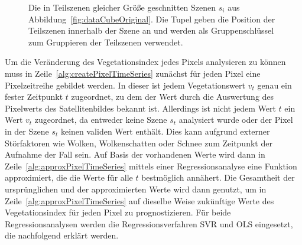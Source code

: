 \begin{figure}[H]
\centering

\caption{Die in Teilszenen gleicher Größe geschnitten Szenen \(s_i\) aus Abbildung~\ref{fig:dataCubeOriginal}. Die Tupel geben die Position der Teilszenen innerhalb der Szene an und werden als Gruppenschlüssel zum Gruppieren der Teilszenen verwendet.} 
\label{fig:dataCubeSliced}
\end{figure}

Um die Veränderung des Vegetationsindex jedes Pixels analysieren zu können muss in Zeile~\ref{alg:createPixelTimeSeries} zunächst für jeden Pixel eine Pixelzeitreihe gebildet werden. In dieser ist jedem Vegetationswert \(v_t\) genau ein fester Zeitpunkt \(t\) zugeordnet, zu dem der Wert durch die Auswertung des Pixelwerts des Satellitenbildes bekannt ist. Allerdings ist nicht jedem Wert \(t\) ein Wert \(v_t\) zugeordnet, da entweder keine Szene \(s_t\) analysiert wurde oder der Pixel in der Szene \(s_t\) keinen validen Wert enthält. Dies kann aufgrund externer Störfaktoren wie Wolken, Wolkenschatten oder Schnee zum Zeitpunkt der Aufnahme der Fall sein. Auf Basis der vorhandenen Werte wird dann in Zeile~\ref{alg:approxPixelTimeSeries} mittels einer Regressionsanalyse eine Funktion approximiert, die die Werte für alle \(t\) bestmöglich annähert.
Die Gesamtheit der ursprünglichen und der approximierten Werte wird dann genutzt, um in Zeile~\ref{alg:approxPixelTimeSeries} auf dieselbe Weise zukünftige Werte des Vegetationsindex für jeden Pixel zu prognostizieren. Für beide Regressionsanalysen werden die Regressionsverfahren SVR und OLS eingesetzt, die nachfolgend erklärt werden. \\

